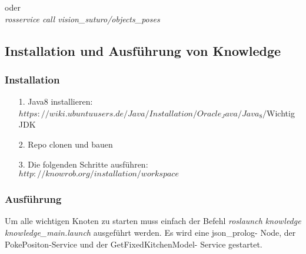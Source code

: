 \documentclass{suturo}
\begin{document}
oder \\

\textit{rosservice call vision\_suturo/objects\_poses}

\subsection{Installation und Ausführung von Knowledge}

\subsubsection{Installation}

\begin{itemize}
\item[1.] Java8 installieren:$ https://wiki.ubuntuusers.de/Java/Installation/Oracle_Java/Java_8/ $Wichtig JDK
\item[2.] Repo clonen und bauen
\item[3.] Die folgenden Schritte ausführen: $http://knowrob.org/installation/workspace$
\end{itemize}

\subsubsection{Ausführung}

Um alle wichtigen Knoten zu starten muss einfach der Befehl \textit{roslaunch knowledge knowledge\_main.launch} ausgeführt werden. Es wird eine json\_prolog- Node, der PokePositon-Service und der GetFixedKitchenModel- Service gestartet.
\end{document}
